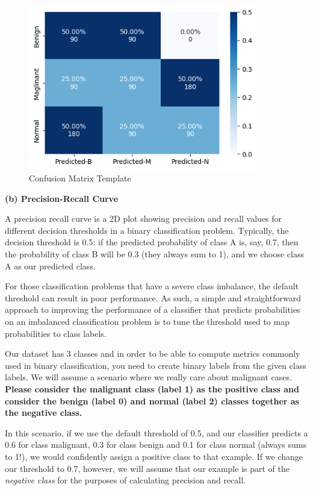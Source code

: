 \documentclass[11pt]{article}
\begin{document}
\begin{figure}[htp!]
\centering
\includegraphics[width = 10cm]{cm_template.png}
\caption{Confusion Matrix Template}
\label{fig:cm_plot}
\end{figure}

\textbf{(b) Precision-Recall Curve}

A precision recall curve is a 2D plot showing precision and recall values for different decision thresholds in a binary classification problem. Typically, the decision threshold is 0.5: if the predicted probability of class A is, say, 0.7, then the probability of class B will be 0.3 (they always sum to 1), and we choose class A as our predicted class.

For those classification problems that have a severe class imbalance, the default threshold can result in poor performance. As such, a simple and straightforward approach to improving the performance of a classifier that predicts probabilities on an imbalanced classification problem is to tune the threshold used to map probabilities to class labels.

Our dataset has 3 classes and in order to be able to compute metrics commonly used in binary classification, you need to create binary labels from the given class labels. We will assume a scenario where we really care about malignant cases. \textbf{Please consider the malignant class (label 1) as the positive class and consider the benign (label 0) and normal (label 2) classes together as the negative class.}

In this scenario, if we use the default threshold of 0.5, and our classifier predicts a 0.6 for class malignant, 0.3 for class benign and 0.1 for class normal (always sums to 1!), we would confidently assign a positive class to that example. If we change our threshold to 0.7, however, we will assume that our example is part of the \textit{negative class} for the purposes of calculating precision and recall.
\end{document}
